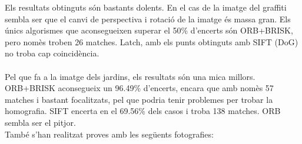 		\noindent
		Els resultats obtinguts són bastants dolents. En el cas de la imatge del graffiti sembla ser que el canvi de perspectiva i rotació de la imatge és massa gran.
		Els únics algorismes que aconsegueixen superar el 50\% d'encerts són ORB+BRISK, pero nomès troben 26 matches. Latch, amb els punts obtinguts amb SIFT (DoG) no troba cap coincidència.\\\\
		Pel que fa a la imatge dels jardins, els resultats són una mica millors. ORB+BRISK aconsegueix un 96.49\% d'encerts, encara que amb nomès 57 matches i bastant focalitzats, pel que podria tenir
		problemes per trobar la homografia. SIFT encerta en el 69.56\% dels casos i troba 138 matches. ORB sembla ser el pitjor.\\

		\noindent
		També s'han realitzat proves amb les següents fotografies:

